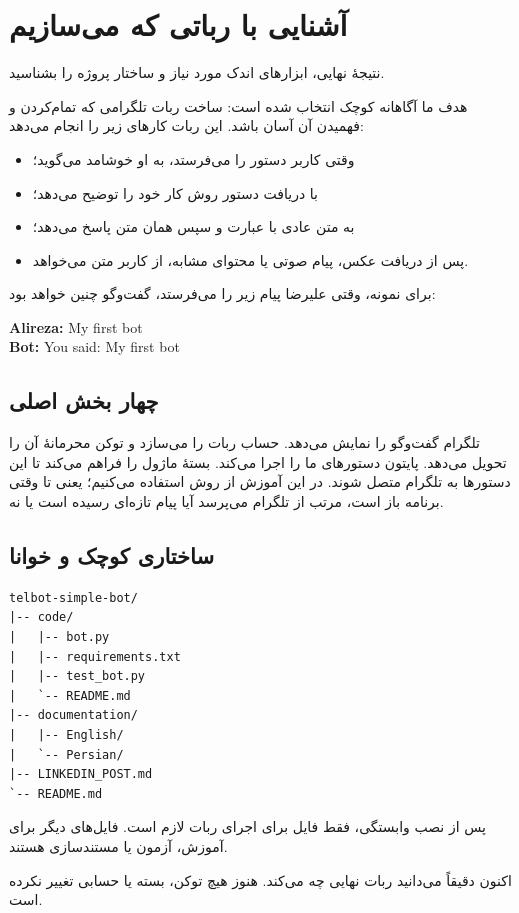 \chapter{آشنایی با رباتی که می‌سازیم}

\begin{goalbox}
نتیجهٔ نهایی، ابزارهای اندک مورد نیاز و ساختار پروژه را بشناسید.
\end{goalbox}

هدف ما آگاهانه کوچک انتخاب شده است: ساخت ربات تلگرامی که تمام‌کردن و فهمیدن
آن آسان باشد. این ربات کارهای زیر را انجام می‌دهد:

\begin{itemize}
\item وقتی کاربر دستور
را می‌فرستد، به او خوشامد می‌گوید؛
\item با دریافت دستور
روش کار خود را توضیح می‌دهد؛
\item به متن عادی با عبارت
و سپس همان متن پاسخ می‌دهد؛
\item پس از دریافت عکس، پیام صوتی یا محتوای مشابه، از کاربر متن می‌خواهد.
\end{itemize}

برای نمونه، وقتی علیرضا پیام زیر را می‌فرستد، گفت‌وگو چنین خواهد بود:

\begin{LTR}
\begin{resultbox}
\textbf{Alireza:} My first bot\\
\textbf{Bot:} You said: My first bot
\end{resultbox}
\end{LTR}

\section{چهار بخش اصلی}

تلگرام گفت‌وگو را نمایش می‌دهد.
حساب ربات را می‌سازد و توکن محرمانهٔ آن را تحویل می‌دهد. پایتون دستورهای ما را
اجرا می‌کند. بستهٔ
ماژول
را فراهم می‌کند تا این دستورها به تلگرام متصل شوند. در این آموزش از روش
استفاده می‌کنیم؛ یعنی تا وقتی برنامه باز است، مرتب از تلگرام می‌پرسد آیا پیام
تازه‌ای رسیده است یا نه.

\section{ساختاری کوچک و خوانا}

\begin{LTR}
\begin{lstlisting}[language={},numbers=none]
telbot-simple-bot/
|-- code/
|   |-- bot.py
|   |-- requirements.txt
|   |-- test_bot.py
|   `-- README.md
|-- documentation/
|   |-- English/
|   `-- Persian/
|-- LINKEDIN_POST.md
`-- README.md
\end{lstlisting}
\end{LTR}

پس از نصب وابستگی، فقط فایل
برای اجرای ربات لازم است. فایل‌های دیگر برای آموزش، آزمون یا مستندسازی هستند.

\begin{checkpointbox}
اکنون دقیقاً می‌دانید ربات نهایی چه می‌کند. هنوز هیچ توکن، بسته یا حسابی تغییر
نکرده است.
\end{checkpointbox}
